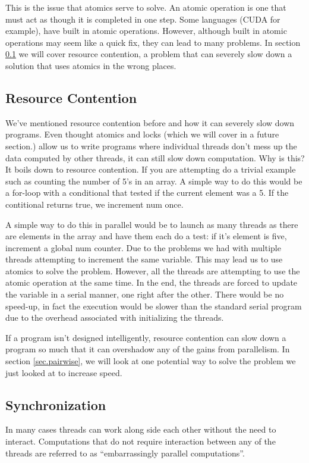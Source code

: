 \documentclass{article}
\newcommand{\comp}[1]{{\ttfamily #1}}
\begin{document}
    This is the issue that atomics serve to solve. An atomic operation is one that must act as though it is completed in one step. Some languages (CUDA for example), have built in atomic operations. However, although built in atomic operations may seem like a quick fix, they can lead to many problems. In section \ref{sec.rescont} we will cover resource contention, a problem that can severely slow down a solution that uses atomics in the wrong places.
    	
    \subsection{Resource Contention}
    \label{sec.rescont}    
    We've mentioned resource contention \done{} before and how it can severely slow down programs. Even thought atomics and locks (which we will cover in a future section.) allow us to write programs where individual threads don't mess up the data computed by other threads, it can still slow down computation. Why is this? It boils down to resource contention. If you are attempting do a trivial example such as counting the number of 5's in an array. A simple way to do this would be a for-loop with a conditional that tested if the current element was a 5. If the contitional returns \comp{true}, we increment \comp{num} once.

    A simple way to do this in parallel would be to launch as many threads as there are elements in the array and have them each do a test: if it's element is five, increment a global \comp{num} counter. Due to the problems we had with multiple threads attempting to increment the same variable.\done{} This may lead us to use atomics to solve the problem. However, all the threads are attempting to use the atomic operation at the same time. In the end, the threads are forced to update the variable in a serial manner, one right after the other. There would be no speed-up, in fact the execution would be slower than the standard serial program due to the overhead associated with initializing the threads.
	
    If a program isn't designed intelligently, resource contention can slow down a program so much that it can overshadow any of the gains from parallelism. In section \ref{sec.pairwise}, we will look at one potential way to solve the problem we just looked at to increase speed.
	
	 \subsection{Synchronization}
    In many cases threads can work along side each other without the need to interact. Computations that do not require interaction between any of the threads are referred to as ``embarrassingly parallel computations''.
\end{document}
